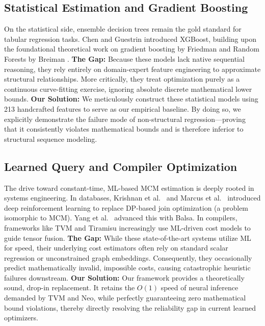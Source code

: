 \documentclass[conference]{IEEEtran}
\begin{document}
\subsection{Statistical Estimation and Gradient Boosting}
On the statistical side, ensemble decision trees remain the gold standard for tabular regression tasks. Chen and Guestrin \cite{b12} introduced XGBoost, building upon the foundational theoretical work on gradient boosting by Friedman \cite{b14} and Random Forests by Breiman \cite{b13}.
\textbf{The Gap:} Because these models lack native sequential reasoning, they rely entirely on domain-expert feature engineering to approximate structural relationships. More critically, they treat optimization purely as a continuous curve-fitting exercise, ignoring absolute discrete mathematical lower bounds.
\textbf{Our Solution:} We meticulously construct these statistical models using 213 handcrafted features to serve as our empirical baseline. By doing so, we explicitly demonstrate the failure mode of non-structural regression—proving that it consistently violates mathematical bounds and is therefore inferior to structural sequence modeling.

\subsection{Learned Query and Compiler Optimization}
The drive toward constant-time, ML-based MCM estimation is deeply rooted in systems engineering. In databases, Krishnan et al.\ \cite{b16} and Marcus et al.\ \cite{b17, b18} introduced deep reinforcement learning to replace DP-based join optimization (a problem isomorphic to MCM). Yang et al.\ \cite{b19} advanced this with Balsa. In compilers, frameworks like TVM \cite{b23} and Tiramisu \cite{b24} increasingly use ML-driven cost models to guide tensor fusion.
\textbf{The Gap:} While these state-of-the-art systems utilize ML for speed, their underlying cost estimators often rely on standard scalar regression or unconstrained graph embeddings. Consequently, they occasionally predict mathematically invalid, impossible costs, causing catastrophic heuristic failures downstream.
\textbf{Our Solution:} Our framework provides a theoretically sound, drop-in replacement. It retains the $O(1)$ speed of neural inference demanded by TVM and Neo, while perfectly guaranteeing zero mathematical bound violations, thereby directly resolving the reliability gap in current learned optimizers.

\end{document}
